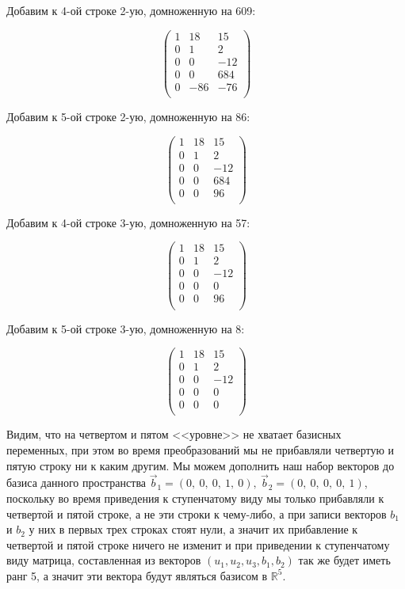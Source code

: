 	Добавим к 4-ой строке 2-ую, домноженную на 609:
	
	\[
	\begin{pmatrix}
	1 & 18 & 15 \\
	0 & 1 & 2 \\
	0 & 0 & -12 \\
	0 & 0 & 684 \\
	0 & -86 & -76 \\
	\end{pmatrix}
	\]
	
	Добавим к 5-ой строке 2-ую, домноженную на 86:
	
	\[
	\begin{pmatrix}
	1 & 18 & 15 \\
	0 & 1 & 2 \\
	0 & 0 & -12 \\
	0 & 0 & 684 \\
	0 & 0 & 96 \\
	\end{pmatrix}
	\]
	
	Добавим к 4-ой строке 3-ую, домноженную на 57:
	
	\[
	\begin{pmatrix}
	1 & 18 & 15 \\
	0 & 1 & 2 \\
	0 & 0 & -12 \\
	0 & 0 & 0 \\
	0 & 0 & 96 \\
	\end{pmatrix}
	\]
	
	Добавим к 5-ой строке 3-ую, домноженную на 8:
	
	\[
	\begin{pmatrix}
	1 & 18 & 15 \\
	0 & 1 & 2 \\
	0 & 0 & -12 \\
	0 & 0 & 0 \\
	0 & 0 & 0 \\
	\end{pmatrix}
	\]
	
	Видим, что на четвертом и пятом <<уровне>> не хватает базисных переменных, при этом во время преобразований мы не прибавляли четвертую и пятую строку ни к каким другим. Мы можем дополнить наш набор векторов до базиса данного пространства $\vec b_1 = (0,\ 0,\ 0,\ 1,\ 0),\ \vec b_2 = (0,\ 0,\ 0,\ 0,\ 1)$, поскольку во время приведения к ступенчатому виду мы только прибавляли к четвертой и пятой строке, а не эти строки к чему-либо, а при записи векторов $b_1$ и $b_2$ у них в первых трех строках стоят нули, а значит их прибавление к четвертой и пятой строке ничего не изменит и при приведении к ступенчатому виду матрица, составленная из векторов $(u_1, u_2, u_3, b_1, b_2)$ так же будет иметь ранг 5, а значит 
	эти вектора будут являться базисом в $\mathbb{R}^5$.
	
